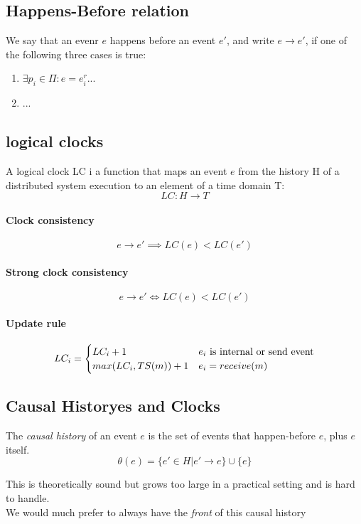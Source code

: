 \documentclass{article}
\begin{document}
\subsection{Happens-Before relation}
We say that an evenr $e$ happens before an event $e'$, and write $e\to e'$, if one of the following three cases is true:
\begin{enumerate}
    \item $\exists p_i \in \Pi: e = e_i^r$...
    \item ...
\end{enumerate}

\subsection{logical clocks}
A logical clock LC i a function that maps an event $e$ from the history H of a distributed system execution to an element of a time domain T:
$$
LC: H\to T
$$

\paragraph{Clock consistency}
$$
e\to e' \implies LC(e) < LC(e')
$$

\paragraph{Strong clock consistency}
$$
e\to e' \iff LC(e) < LC(e')
$$

\paragraph{Update rule}
$$
LC_i = \begin{cases}
    LC_i + 1 & \text{$e_i$ is internal or send event} \\
    max(LC_i, TS(m))+1 & e_i=receive(m)
\end{cases}
$$

\subsection{Causal Historyes and Clocks}
The \textit{causal history} of an event $e$ is the set of events that happen-before $e$, plus $e$ itself.
$$
\theta(e) = \{e'\in H | e'\to e\} \cup \{e\}
$$

This is theoretically sound but grows too large in a practical setting and is hard to handle.\\
We would much prefer to always have the \textit{front} of this causal history
\end{document}
